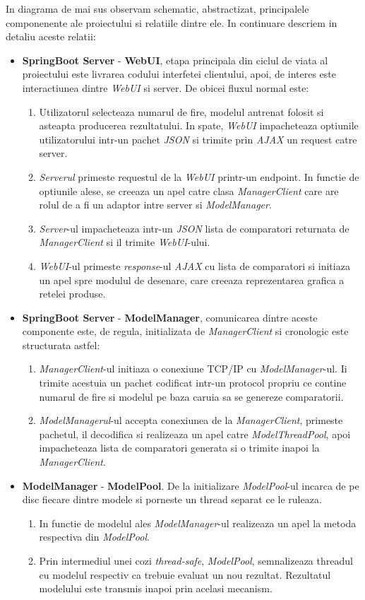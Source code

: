 \documentclass[12pt]{article}
\begin{document}
In diagrama de mai sus observam schematic, abstractizat, principalele componenente ale proiectului si relatiile dintre ele. In continuare descriem in detaliu aceste relatii: 
\begin{itemize}
	\item \textbf{SpringBoot Server} - \textbf{WebUI}, etapa principala din ciclul de viata al proiectului este livrarea codului interfetei clientului, apoi, de interes este interactiunea dintre \textit{WebUI} si server. De obicei fluxul normal este:
	\begin{enumerate}
		\item Utilizatorul selecteaza numarul de fire, modelul antrenat folosit si asteapta producerea rezultatului. In spate, \textit{WebUI} impacheteaza optiunile utilizatorului intr-un pachet \textit{JSON} si trimite prin \textit{AJAX} un request catre server.
		\item \textit{Serverul} primeste requestul de la \textit{WebUI} printr-un endpoint. In functie de optiunile alese, se creeaza un apel catre clasa \textit{ManagerClient} care are rolul de a fi un adaptor intre server si \textit{ModelManager}. 
		\item \textit{Server}-ul impacheteaza intr-un \textit{JSON} lista de comparatori returnata de \textit{ManagerClient} si il trimite \textit{WebUI}-ului.
		\item \textit{WebUI}-ul primeste \textit{response}-ul \textit{AJAX} cu lista de comparatori si initiaza un apel spre modulul de desenare, care creeaza reprezentarea grafica a retelei produse.
	\end{enumerate}
	\item \textbf{SpringBoot Server} - \textbf{ModelManager}, comunicarea dintre aceste componente este, de regula, initializata de \textit{ManagerClient} si cronologic este structurata astfel:
	\begin{enumerate}
		\item \textit{ManagerClient}-ul initiaza o conexiune TCP/IP cu \textit{ModelManager}-ul. Ii trimite acestuia un pachet codificat intr-un protocol propriu ce contine numarul de fire si modelul pe baza caruia sa se genereze comparatorii.
		\item \textit{ModelManagerul}-ul accepta conexiunea de la \textit{ManagerClient}, primeste pachetul, il decodifica si realizeaza un apel catre \textit{ModelThreadPool}, apoi impacheteaza lista de comparatori generata si o trimite inapoi la \textit{ManagerClient}. 
	\end{enumerate}
	\item \textbf{ModelManager} - \textbf{ModelPool}. De la initializare \textit{ModelPool}-ul incarca de pe disc fiecare dintre modele si porneste un thread separat ce le ruleaza. 
	\begin{enumerate}
		\item In functie de modelul ales \textit{ModelManager}-ul realizeaza un apel la metoda respectiva din \textit{ModelPool}.
		\item Prin intermediul unei cozi \textit{thread-safe}, \textit{ModelPool}, semnalizeaza threadul cu modelul respectiv ca trebuie evaluat un nou rezultat. Rezultatul modelului este transmis inapoi prin acelasi mecanism.
	\end{enumerate}
	

\end{itemize}
\end{document}
